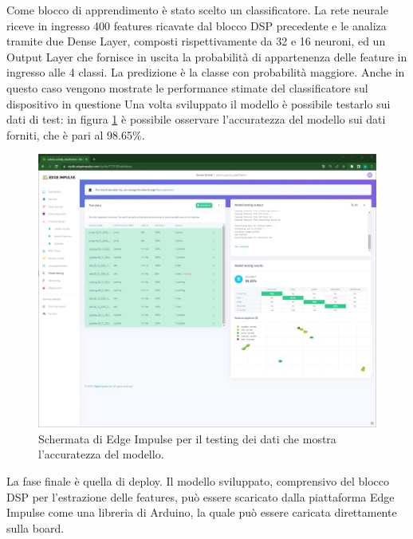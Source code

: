 Come blocco di apprendimento è stato scelto un classificatore. La rete neurale riceve in ingresso 400 features ricavate dal blocco DSP precedente e le analiza tramite due Dense Layer, composti rispettivamente da 32 e 16 neuroni, ed un Output Layer che fornisce in uscita la probabilità di appartenenza delle feature in ingresso alle 4 classi. La predizione è la classe con probabilità maggiore. Anche in questo caso vengono mostrate le performance stimate del classificatore sul dispositivo in questione
Una volta sviluppato il modello è possibile testarlo sui dati di test: in figura \ref{fig:model_test} è possibile osservare l'accuratezza del modello sui dati forniti, che è pari al 98.65\%. 
\begin{figure}[h!]
	\centering
	\includegraphics[width=0.5\linewidth]{./ImageFiles/model_test.jpg}
	\caption{Schermata di Edge Impulse per il testing dei dati che mostra l'accuratezza del modello.}
	\label{fig:model_test}
\end{figure}

La fase finale è quella di deploy. Il modello sviluppato, comprensivo del blocco DSP per l'estrazione delle features, può essere scaricato dalla piattaforma Edge Impulse come una libreria di Arduino, la quale può essere caricata direttamente sulla board. 


